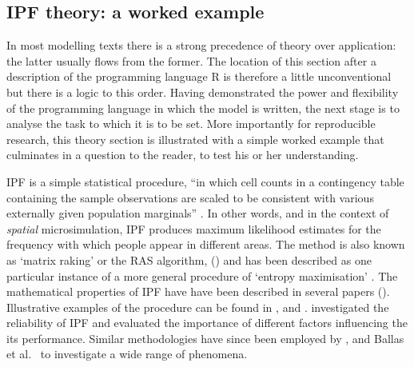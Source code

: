 \subsection{IPF theory: a worked example} \label{s:theory}
In most modelling texts there is a strong precedence of theory over
application: the latter usually flows from the former. The location 
of this section after a description of the programming language
R is therefore a little unconventional but there is a logic to this order. 
Having demonstrated the power and flexibility of the programming language in
which the model is written, the next stage is to analyse the task to which it
is to be set. More importantly for reproducible research, this theory section
is illustrated with a simple worked example that culminates in
a question to the reader, to test his or her understanding.

IPF is a simple statistical procedure, ``in which cell counts in a contingency
table containing the sample observations are scaled to be consistent with
various externally given population marginals'' \citep{mcfadden2006testing}. In
other words, and in the context of \emph{spatial} microsimulation, IPF produces
maximum likelihood estimates for the frequency with which people appear in
different areas. The method is also known as `matrix raking' or the RAS
algorithm, (\citealp{Birkin1988, Muller2010,
Simpson2005, Kalantari2008, Jirousek1995}) and has been described as one
particular instance of a more general procedure of `entropy maximisation'
\citep{Johnston1993, blien1998entropy}.
The mathematical properties of IPF
have have been described in several papers
(\citealp{Bishop1975, Fienberg1970, Birkin1988}).
Illustrative examples of the procedure can be found in
\citet{Saito1992}, \citet{Wong1992}
and \citet{Norman1999a}. \citet{Wong1992} investigated the reliability of IPF
and evaluated the importance of different factors influencing the its
performance. Similar methodologies have since been employed by
\citet{Mitchell2000}, \citet{Williamson2002} and
Ballas et al.~\citeyearpar{Ballas2005c, Ballas2005}
to investigate a wide range of phenomena.

